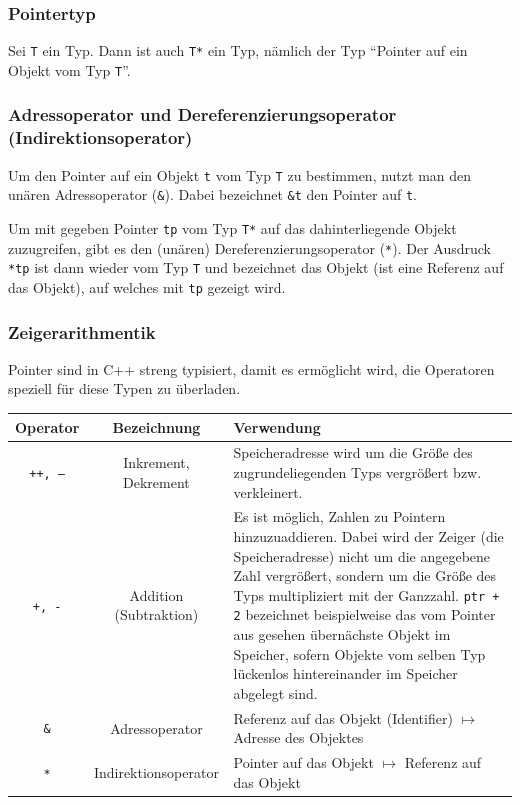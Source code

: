 \documentclass[a4paper]{report}
\begin{document}
\subsubsection{Pointertyp}
Sei \texttt{T} ein Typ. Dann ist auch \texttt{T*} ein Typ, nämlich der Typ "`Pointer auf ein Objekt vom Typ \texttt{T}"'.

\subsubsection{Adressoperator und Dereferenzierungsoperator (Indirektionsoperator)}
Um den Pointer auf ein Objekt \texttt{t} vom Typ \texttt{T} zu bestimmen, nutzt man den unären Adressoperator (\texttt{\&}). Dabei bezeichnet \texttt{\&t} den Pointer auf \texttt{t}.

Um mit gegeben Pointer \texttt{tp} vom Typ \texttt{T*} auf das dahinterliegende Objekt zuzugreifen, gibt es den (unären) Dereferenzierungsoperator (\texttt{*}). Der Ausdruck \texttt{*tp} ist dann wieder vom Typ \texttt{T} und bezeichnet das Objekt (ist eine Referenz auf das Objekt), auf welches mit \texttt{tp} gezeigt wird.

\subsubsection{Zeigerarithmentik}
Pointer sind in C++ streng typisiert, damit es ermöglicht wird, die Operatoren speziell für diese Typen zu überladen.
\begin{center}
	\begin{tabular}{|c|c|p{10cm}|} \hline
		\textbf{Operator} & \textbf{Bezeichnung} & \textbf{Verwendung} \\ \hline
		\texttt{++, --} & Inkrement, Dekrement & Speicheradresse wird um die Größe des zugrundeliegenden Typs vergrößert bzw. verkleinert. \\ \hline
		\texttt{+, -} & Addition (Subtraktion) & Es ist möglich, Zahlen zu Pointern hinzuzuaddieren. Dabei wird der Zeiger (die Speicheradresse) nicht um die angegebene Zahl vergrößert, sondern um die Größe des Typs multipliziert mit der Ganzzahl. \newline
		\texttt{ptr + 2} bezeichnet beispielweise das vom Pointer aus gesehen übernächste Objekt im Speicher, sofern Objekte vom selben Typ lückenlos hintereinander im Speicher abgelegt sind.\\ \hline
		\texttt{\&} & Adressoperator & Referenz auf das Objekt (Identifier) $\mapsto$ Adresse des Objektes \\ \hline
		\texttt{*} & Indirektionsoperator & Pointer auf das Objekt $\mapsto$ Referenz auf das Objekt \\ \hline
	\end{tabular}
\end{center}
\end{document}
